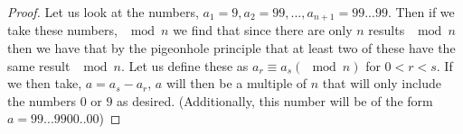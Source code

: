\documentclass[11pt, letter]{amsart}
\theoremstyle{definition}
\begin{document}
\begin{proof}
    Let us look at the numbers, $a_1 = 9, a_2 = 99, ..., a_{n+1} = 99...99$. Then if we take these numbers, $\mod n$ we find that since there are only $n$ results $\mod n$ then we have that by the pigeonhole principle that at least two of these have the same result $\mod n$. Let us define these as $a_r \equiv a_s (\mod n)$ for $0 < r < s$. If we then take, $a = a_s - a_r$, $a$ will then be a multiple of $n$ that will only include the numbers $0$ or $9$ as desired. (Additionally, this number will be of the form $a = 99...9900..00$)
\end{proof}
\end{document}
